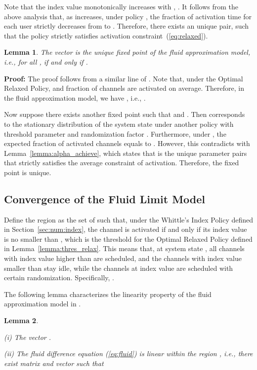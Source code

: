 \documentclass[11pt,twocolumn]{IEEEtran}
\newtheorem{lemma}{Lemma}
\begin{document}
Note that the index value  monotonically increases with , .  It follows from the above analysis that, as  increases, under policy , the fraction of activation time for each user strictly decreases from  to . Therefore, there exists an unique  pair, such that the policy  strictly satisfies activation constraint~(\ref{eq:relaxed}). 


\begin{lemma}
\label{lemma:fixpt}
The vector  is the unique fixed point of the fluid approximation model, i.e., for all ,
 if and only if .
\end{lemma}

\noindent \textbf{Proof:} The proof follows from a similar line of \cite{Weber}. Note that, under the Optimal Relaxed Policy,  and  fraction of channels are activated on average. Therefore, in the fluid approximation model, we have , i.e., .

Now suppose there exists another fixed point  such that  and . Then  corresponds to the stationary distribution of the system state under another policy  with threshold parameter  and randomization factor . Furthermore, under , the expected fraction of activated channels equals to . However, this contradicts with Lemma~\ref{lemma:alpha_achieve}, which states that  is the unique parameter pairs that strictly satisfies the average constraint of activation. Therefore, the fixed point  is unique.
 \hfill 

\subsection{Convergence of the Fluid Limit Model}

Define the region  as the set of  such that, under the Whittle's Index Policy defined in Section~\ref{sec:num:index}, the channel is activated if and only if its index value is no smaller than , which is the threshold for the Optimal Relaxed Policy defined in Lemma~\ref{lemma:thres_relax}. This means that, at system state , all channels with index value higher than  are scheduled, and the channels with index value smaller than  stay idle, while the channels at index value  are scheduled with certain randomization. Specifically, .

The following lemma characterizes the linearity property of the fluid approximation model in .
\vspace{3pt}

\begin{lemma}\label{lemma:piecewiseL}

\noindent(i) The vector  .

\noindent(ii) The fluid difference equation (\ref{eq:fluid}) is linear within the region , i.e., there exist matrix  and vector  such that

\end{lemma}
\end{document}
